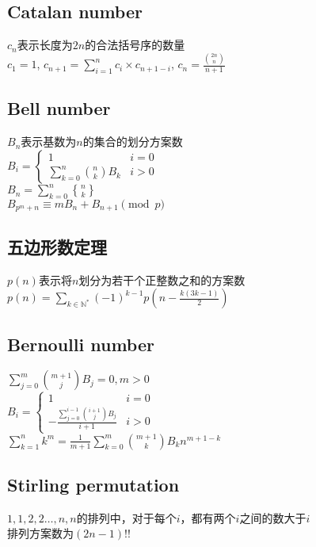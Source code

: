     \subsection*{Catalan number}
        $ c_n $表示长度为$ 2n $的合法括号序的数量
        \\$ c_1 = 1 $, $ c_{n+1} = \sum\limits_{i=1}^{n} c_i \times c_{n + 1 - i} $, $ c_n = \frac{\binom{2n}{n}}{n + 1} $
    \subsection*{Bell number}
        $ B_n $表示基数为$ n $的集合的划分方案数
        \\$ B_i = \begin{cases}
            1 & i = 0\\
            \sum\limits_{k = 0}^{n} \binom{n}{k} B_k & i > 0
        \end{cases} $
        \\$ B_n = \sum\limits_{k = 0}^{n} {n \brace k} $
        \\$ B_{p^m + n} \equiv m B_n + B_{n + 1} \pmod p $
    \subsection*{五边形数定理}
        $ p(n) $表示将$ n $划分为若干个正整数之和的方案数
        \\$ p(n) = \sum\limits_{k \in \mathbb{N}^\ast} (-1)^{k - 1} p(n - \frac{k(3k - 1)}{2}) $
    \subsection*{Bernoulli number}
        \noindent$ \sum\limits_{j = 0}^{m} \binom{m + 1}{j} B_j = 0, m > 0 $
        \\$ B_i = \begin{cases}
            1 & i = 0\\
            -\frac{\sum\limits_{j = 0}^{i - 1} \binom{i + 1}{j} B_j}{i + 1} & i > 0
        \end{cases} $
        \\$ \sum\limits_{k = 1}^{n} k ^ m = \frac{1}{m + 1} \sum\limits_{k = 0}^{m} \binom{m + 1}{k} B_k n ^ {m + 1 - k} $
    \subsection*{Stirling permutation}
        $ 1, 1, 2, 2 \dots , n, n $的排列中，对于每个$ i $，都有两个$ i $之间的数大于$ i $
        \\排列方案数为$ (2n - 1)!! $
